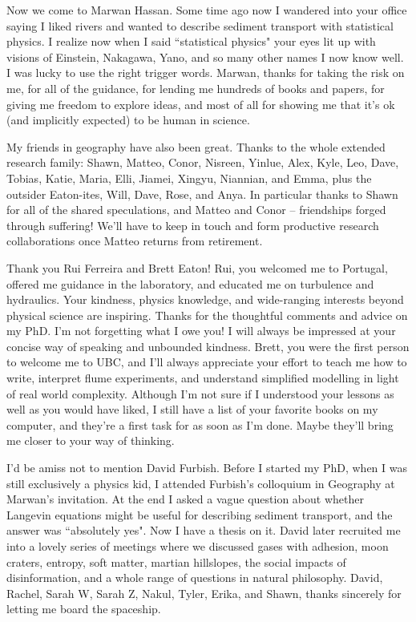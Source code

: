 Now we come to Marwan Hassan. Some time ago now I wandered into your office saying I liked rivers and wanted to describe sediment transport with statistical physics. I realize now when I said ``statistical physics" your eyes lit up with visions of Einstein, Nakagawa, Yano, and so many other names I now know well. I was lucky to use the right trigger words.
Marwan, thanks for taking the risk on me, for all of the guidance, for lending me hundreds of books and papers, for giving me freedom to explore ideas, and most of all for showing me that it's ok (and implicitly expected) to be human in science. 

My friends in geography have also been great. Thanks to the whole extended research family: Shawn, Matteo, Conor, Nisreen, Yinlue, Alex, Kyle, Leo, Dave, Tobias, Katie, Maria, Elli, Jiamei, Xingyu, Niannian, and Emma, plus the outsider Eaton-ites, Will, Dave, Rose, and Anya. In particular thanks to Shawn for all of the shared speculations, and Matteo and Conor -- friendships forged through suffering! We'll have to keep in touch and form productive research collaborations once Matteo returns from retirement.

Thank you Rui Ferreira and Brett Eaton!
Rui, you welcomed me to Portugal, offered me guidance in the laboratory, and educated me on turbulence and hydraulics. Your kindness, physics knowledge, and wide-ranging interests beyond physical science are inspiring. Thanks for the thoughtful comments and advice on my PhD. I'm not forgetting what I owe you! I will always be impressed at your concise way of speaking and unbounded kindness.
Brett, you were the first person to welcome me to UBC, and I'll always appreciate your effort to teach me how to write, interpret flume experiments, and understand simplified modelling in light of real world complexity. Although I'm not sure if I understood your lessons as well as you would have liked, I still have a list of your favorite books on my computer, and they're a first task for as soon as I'm done. Maybe they'll bring me closer to your way of thinking.

I'd be amiss not to mention David Furbish. Before I started my PhD, when I was still exclusively a physics kid, I attended Furbish's colloquium in Geography at Marwan's invitation. At the end I asked a vague question about whether Langevin equations might be useful for describing sediment transport, and the answer was ``absolutely yes". Now I have a thesis on it. David later recruited me into a lovely series of meetings where we discussed gases with adhesion, moon craters, entropy, soft matter, martian hillslopes, the social impacts of disinformation, and a whole range of questions in natural philosophy. David, Rachel, Sarah W, Sarah Z, Nakul, Tyler, Erika, and Shawn, thanks sincerely for letting me board the spaceship.

